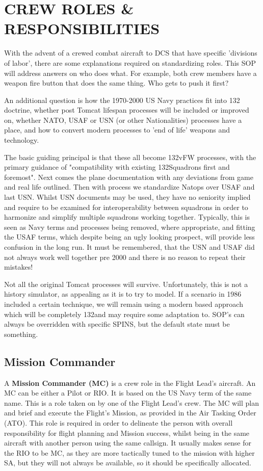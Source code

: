 \section{CREW ROLES \& RESPONSIBILITIES}

With the advent of a crewed combat aircraft to DCS that have specific
'divisions of labor', there are some explanations required on standardizing
roles. This SOP will address answers on who does what. For example, both crew
members have a weapon fire button that does the same thing. Who gets to push it
first?

An additional question is how the 1970-2000 US Navy practices fit into 132\nd
doctrine, whether post Tomcat lifespan processes will be included or improved
on, whether NATO, USAF or USN (or other Nationalities) processes have a place,
and how to convert modern processes to 'end of life' weapons and technology.

The basic guiding principal is that these all become 132\nd vFW processes, with
the primary guidance of "compatibility with existing 132\nd Squadrons first and
foremost". Next comes the plane documentation with any deviations from game and
real life outlined. Then with process we standardize Natops over USAF and last
USN. Whilst USN documents may be used, they have no seniority implied and
require to be examined for interoperability between squadrons in order to
harmonize and simplify multiple squadrons working together. Typically, this is
seen as Navy terms and processes being removed, where appropriate, and fitting
the USAF terms, which despite being an ugly looking prospect, will provide less
confusion in the long run. It must be remembered, that the USN and USAF did not
always work well together pre 2000 and there is no reason to repeat their
mistakes!

Not all the original Tomcat processes will survive. Unfortunately, this is not
a history simulator, as appealing as it is to try to model. If a scenario in
1986 included a certain technique, we will remain using a modern based approach
which will be completely 132\nd and may require some adaptation to. SOP's can
always be overridden with specific SPINS, but the default state must be
something.

\subsection*{Mission Commander}

A \textbf{Mission Commander (MC)} is a crew role in the Flight Lead's aircraft.
An MC can be either a Pilot or RIO. It is based on the US Navy term of the same
name.  This is a role taken on by one of the Flight Lead's crew. The MC will
plan and brief and execute the Flight's Mission, as provided in the Air Tasking
Order (ATO). This role is required in order to delineate the person with
overall responsibility for flight planning and Mission success, whilst being in
the same aircraft with another person using the same callsign. It usually makes
sense for the RIO to be MC, as they are more tactically tuned to the mission
with higher SA, but they will not always be available, so it should be
specifically allocated.

